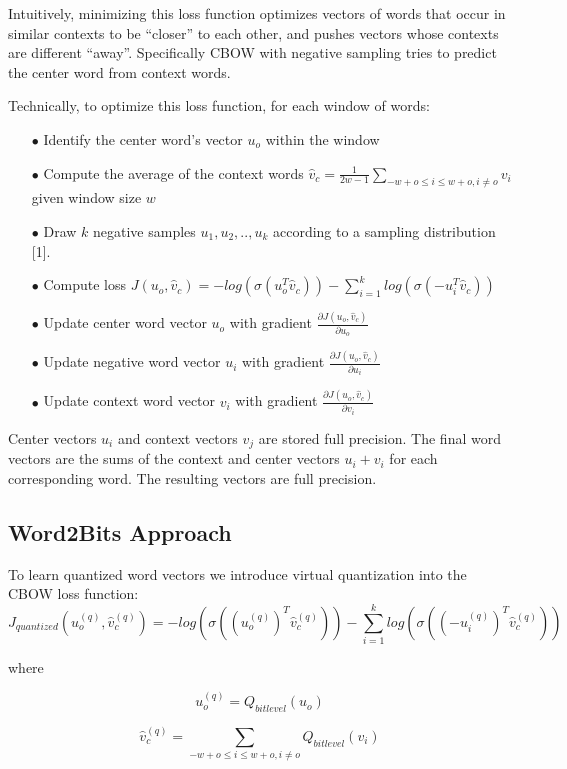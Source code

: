 \documentclass{article} %
\begin{document}
Intuitively, minimizing this loss function optimizes vectors of words
that occur in similar contexts to be ``closer'' to each other, and
pushes vectors whose contexts are different ``away''. Specifically
CBOW with negative sampling tries to predict the center word from
context words.

Technically, to optimize this loss function, for each window of words:

\begin{enumerate}

\item[$\bullet$] Identify the center word's vector $u_o$ within the window
\item[$\bullet$] Compute the average of the context words $\hat{v}_c = \frac{1}{2w-1} \sum_{-w+o \leq i \leq w+o, i \neq o} v_i$ given window size $w$
\item[$\bullet$] Draw $k$ negative samples $u_1, u_2, .., u_k$ according to a sampling distribution [1].
\item[$\bullet$] Compute loss $J(u_o, \hat{v}_c) = -log(\sigma(u_o^T\hat{v}_c)) - \sum_{i=1}^{k} log(\sigma(-u_i^T\hat{v}_c))$
\item[$\bullet$] Update center word vector $u_o$ with gradient $\frac{\partial J(u_o, \hat{v}_c)}{\partial u_o}$
\item[$\bullet$] Update negative word vector $u_i$ with gradient $\frac{\partial J(u_o, \hat{v}_c)}{\partial u_i}$
\item[$\bullet$] Update context word vector $v_i$ with gradient $\frac{\partial J(u_o, \hat{v}_c)}{\partial v_i}$
\end{enumerate}

Center vectors $u_i$ and context vectors $v_j$ are stored full
precision. The final word vectors are the sums of the context and
center vectors $u_i + v_i$ for each corresponding word. The resulting
vectors are full precision.

\subsection{Word2Bits Approach}
To learn quantized word vectors we introduce virtual quantization into the CBOW loss function:
$$
J_{quantized}(u^{(q)}_o, \hat{v}^{(q)}_c) = -log(\sigma((u^{(q)}_{o})^{T} \hat{v}^{(q)}_c)) - \sum_{i=1}^{k} log(\sigma((-u^{(q)}_i)^T\hat{v}^{(q)}_c))
$$

where

$$
u^{(q)}_o = Q_{bitlevel}(u_o)
$$

$$
\hat{v}^{(q)}_c = \sum_{-w+o \leq i \leq w+o,i \neq o} Q_{bitlevel}(v_i)
$$
\end{document}
